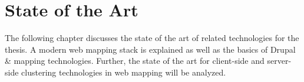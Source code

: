 
%
%

\chapter{State of the Art}
\label{chapter:state}

The following chapter discusses the state of the art of related technologies for the thesis. A modern web mapping stack is explained as well as the basics of Drupal \& mapping technologies. Further, the state of the art for client-side and server-side clustering technologies in web mapping will be analyzed.






